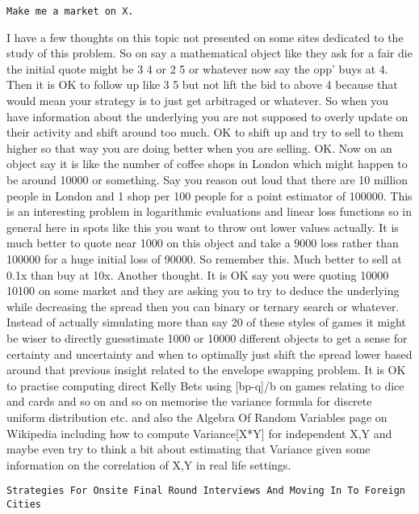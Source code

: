 \texttt{Make me a market on X.}

I have a few thoughts on this topic not presented on some sites dedicated to the study of this problem. So on say a mathematical object like they ask for a fair die the initial quote might be 3 4 or 2 5 or whatever now say the opp' buys at 4. Then it is OK to follow up like 3 5 but not lift the bid to above 4 because that would mean your strategy is to just get arbitraged or whatever. So when you have information about the underlying you are not supposed to overly update on their activity and shift around too much. OK to shift up and try to sell to them higher so that way you are doing better when you are selling. OK. Now on an object say it is like the number of coffee shops in London which might happen to be around 10000 or something. Say you reason out loud that there are 10 million people in London and 1 shop per 100 people for a point estimator of 100000. This is an interesting problem in logarithmic evaluations and linear loss functions so in general here in spots like this you want to throw out lower values actually. It is much better to quote near 1000 on this object and take a 9000 loss rather than 100000 for a huge initial loss of 90000. So remember this. Much better to sell at 0.1x than buy at 10x. Another thought. It is OK say you were quoting 10000 10100 on some market and they are asking you to try to deduce the underlying while decreasing the spread then you can binary or ternary search or whatever. Instead of actually simulating more than say 20 of these styles of games it might be wiser to directly guesstimate 1000 or 10000 different objects to get a sense for certainty and uncertainty and when to optimally just shift the spread lower based around that previous insight related to the envelope swapping problem. It is OK to practise computing direct Kelly Bets using [bp-q]/b on games relating to dice and cards and so on and so on memorise the variance formula for discrete uniform distribution etc. and also the Algebra Of Random Variables page on Wikipedia including how to compute Variance[X*Y] for independent X,Y and maybe even try to think a bit about estimating that Variance given some information on the correlation of X,Y in real life settings.

\texttt{Strategies For Onsite Final Round Interviews And Moving In To Foreign Cities}

